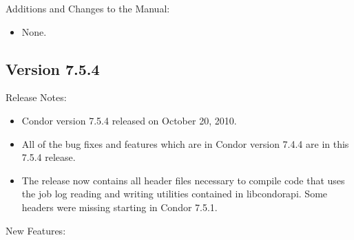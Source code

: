 \noindent Additions and Changes to the Manual:

\begin{itemize}

\item None.

\end{itemize}



\subsection*{\label{sec:New-7-5-4}Version 7.5.4}

\noindent Release Notes:

\begin{itemize}

\item Condor version 7.5.4 released on October 20, 2010.

\item All of the bug fixes and features which are in
Condor version 7.4.4 are in this 7.5.4 release.

\item The release now contains all header files necessary to compile
code that uses the job log reading and writing utilities contained
in libcondorapi. Some headers were missing starting in Condor 7.5.1.

\end{itemize}


\noindent New Features:

